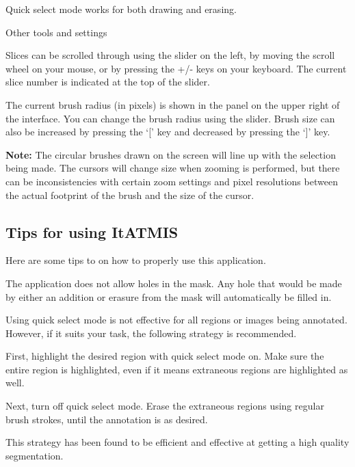 \documentclass[twoside,a4paper]{refart}
\begin{document}
Quick select mode works for both drawing and erasing.

\large{Other tools and settings}

\normalsize

Slices can be scrolled through using the slider on the left, by moving the scroll wheel on your mouse, or by pressing the +/- keys on your keyboard. The current slice number is indicated at the top of the slider.

The current brush radius (in pixels) is shown in the panel on the upper right of the interface. You can change the brush radius using the slider. Brush size can also be increased by pressing the `[' key and decreased by pressing the `]' key.

\textbf{Note:} The circular brushes drawn on the screen will line up with the selection being made. The cursors will change size when zooming is performed, but there can be inconsistencies with certain zoom settings and pixel resolutions between the actual footprint of the brush and the size of the cursor. 



\subsection{Tips for using ItATMIS}
Here are some tips to on how to properly use this application.

The application does not allow holes in the mask. Any hole that would be made by either an addition or erasure from the mask will automatically be filled in.

Using quick select mode is not effective for all regions or images being annotated. However, if it suits your task, the following strategy is recommended.

First, highlight the desired region with quick select mode on. Make sure the entire region is highlighted, even if it means extraneous regions are highlighted as well.

Next, turn off quick select mode. Erase the extraneous regions using regular brush strokes, until the annotation is as desired.

This strategy has been found to be efficient and effective at getting a high quality segmentation.




\printindex
\end{document}
